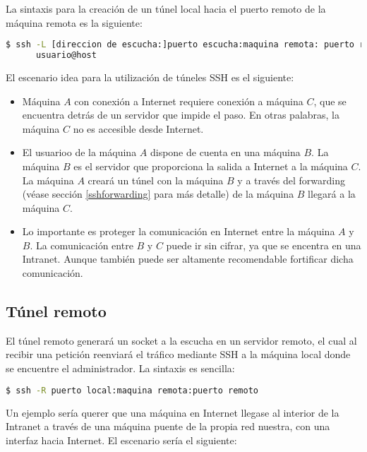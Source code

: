 \documentclass[a4paper, 11pt, titlepage]{article}
\begin{document}
        La sintaxis para la creación de un túnel local hacia el puerto remoto de la máquina remota es la 
        siguiente:
        
        \begin{lstlisting}[language=bash,basicstyle=\tiny]
    $ ssh -L [direccion de escucha:]puerto escucha:maquina remota: puerto remoto 
      usuario@host\end{lstlisting}
        
        El escenario idea para la utilización de túneles SSH es el siguiente:

        \begin{itemize}
            \item Máquina $A$ con conexión a Internet requiere conexión a máquina $C$, que se encuentra detrás 
            de un servidor que impide el paso. En otras palabras, la máquina $C$ no es accesible desde Internet.
            \item El usuarioo de la máquina $A$ dispone de cuenta en una máquina $B$. La máquina $B$ es el servidor 
            que proporciona la salida a Internet a la máquina $C$. La máquina $A$ creará un túnel con la máquina $B$ 
            y a través del forwarding (véase sección \ref{sshforwarding} para más detalle) de la máquina $B$ llegará 
            a la máquina $C$.
            \item Lo importante es proteger la comunicación en Internet entre la máquina $A$ y $B$. La comunicación 
            entre $B$ y $C$ puede ir sin cifrar, ya que se encentra en una Intranet. Aunque también puede ser altamente 
            recomendable fortificar dicha comunicación.
        \end{itemize}

    \subsection{Túnel remoto}

        El túnel remoto generará un socket a la escucha en un servidor remoto, el cual al recibir una petición 
        reenviará el tráfico mediante SSH a la máquina local donde se encuentre el administrador. La sintaxis es 
        sencilla:

        \begin{lstlisting}[language=bash,basicstyle=\footnotesize]
    $ ssh -R puerto local:maquina remota:puerto remoto\end{lstlisting}
        
        Un ejemplo sería querer que una máquina en Internet llegase al interior de la Intranet a través de una 
        máquina puente de la propia red nuestra, con una interfaz hacia Internet. El escenario sería el siguiente:
\end{document}
